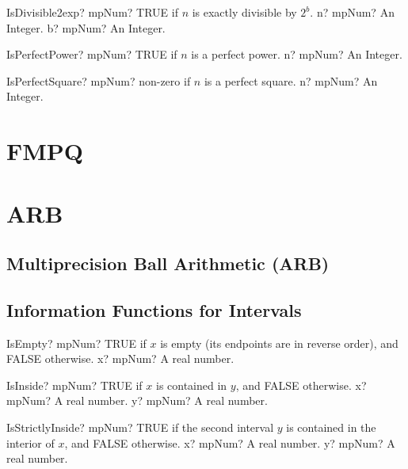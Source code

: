 \documentclass[12pt,a4paper,openany]{book}
\begin{document}
\begin{mpFunctionsExtract}
\mpFunctionTwo
{IsDivisible2exp? mpNum? TRUE if $n$ is exactly divisible by $2^b$.}
{n? mpNum? An Integer.}
{b? mpNum? An Integer.}
\end{mpFunctionsExtract}

\begin{mpFunctionsExtract}
\mpFunctionOne
{IsPerfectPower? mpNum? TRUE if $n$ is a perfect power.}
{n? mpNum? An Integer.}
\end{mpFunctionsExtract}

\begin{mpFunctionsExtract}
\mpFunctionOne
{IsPerfectSquare? mpNum? non-zero if $n$ is a perfect square.}
{n? mpNum? An Integer.}
\end{mpFunctionsExtract}

\chapter{FMPQ}

\chapter{ARB}

\section{Multiprecision Ball Arithmetic (ARB)}

\section{Information Functions for Intervals}

\begin{mpFunctionsExtract}
\mpFunctionOne
{IsEmpty? mpNum? TRUE  if $x$ is empty (its endpoints are in reverse order), and FALSE otherwise.}
{x? mpNum? A real number.}
\end{mpFunctionsExtract}

\begin{mpFunctionsExtract}
\mpFunctionTwo
{IsInside? mpNum? TRUE  if $x$ is contained in $y$, and FALSE otherwise.}
{x? mpNum? A real number.}
{y? mpNum? A real number.}
\end{mpFunctionsExtract}

\begin{mpFunctionsExtract}
\mpFunctionTwo
{IsStrictlyInside? mpNum? TRUE  if the second interval $y$ is contained in the interior of $x$, and FALSE otherwise.}
{x? mpNum? A real number.}
{y? mpNum? A real number.}
\end{mpFunctionsExtract}
\end{document}
